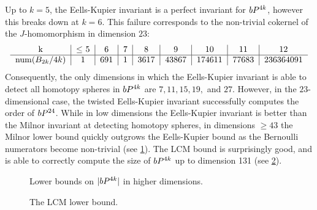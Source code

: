 Up to $k=5$, the Eells-Kupier invariant is a perfect invariant for $bP^{4k}$, however this breaks down at $k=6$. This failure corresponds to the non-trivial cokernel of the $J$-homomorphism in dimension $23$:
\[
	\begin{tabular}{c|c|c|c|c|c|c|c|c}
		k & $\leq$ 5 & 6 & 7 & 8 & 9 & 10 & 11 & 12\\
		\hline
		$\numer(B_{2k}/4k)$ & 1 & 691 & 1 & 3617 & 43867 & 174611 & 77683 & 236364091\\
	\end{tabular}
\]
Consequently, the only dimensions in which the Eells-Kupier invariant is able to detect all homotopy spheres in $bP^{4k}$ are $7,11,15,19,$ and $27$. However, in the $23$-dimensional case, the twisted Eells-Kupier invariant successfully computes the order of $bP^{24}$. 
While in low dimensions the Eells-Kupier invariant is better than the Milnor invariant at detecting homotopy spheres, in dimensions $\geq 43$ the Milnor lower bound quickly outgrows the Eells-Kupier bound as the Bernoulli numerators become non-trivial (see \cref{fig:high-dim-lower-bound}). The LCM bound is surprisingly good, and is able to correctly compute the size of $bP^{4k}$ up to dimension 131 (see \cref{fig:lcm-lower-bound}).

\begin{figure}[ht]
	\centering
\caption{Lower bounds on $|bP^{4k}|$ in higher dimensions.}\label{fig:high-dim-lower-bound}
\end{figure}

\begin{figure}[ht]
	\centering
\caption{The LCM lower bound.}\label{fig:lcm-lower-bound}
\end{figure}

